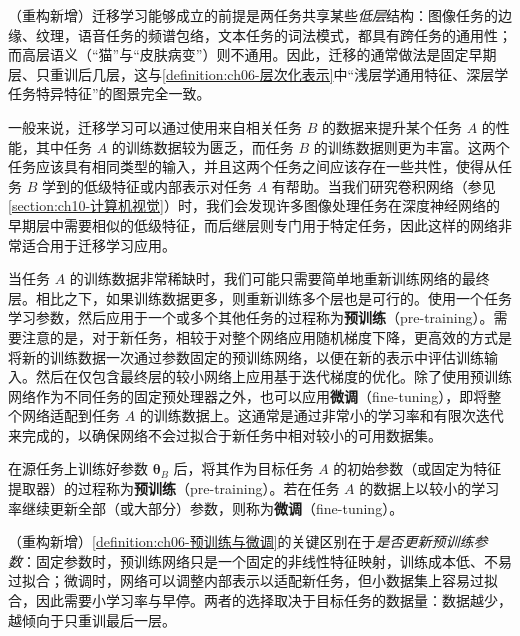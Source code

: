 \documentclass[../../main.tex]{subfiles}
\begin{document}
\begin{remark}（重构新增）迁移学习能够成立的前提是两任务共享某些\emph{低层}结构：图像任务的边缘、纹理，语音任务的频谱包络，文本任务的词法模式，都具有跨任务的通用性；而高层语义（“猫”与“皮肤病变”）则不通用。因此，迁移的通常做法是固定早期层、只重训后几层，这与\cref{definition:ch06-层次化表示}中“浅层学通用特征、深层学任务特异特征”的图景完全一致。
\end{remark}

一般来说，迁移学习可以通过使用来自相关任务 $B$ 的数据来提升某个任务 $A$ 的性能，其中任务 $A$ 的训练数据较为匮乏，而任务 $B$ 的训练数据则更为丰富。这两个任务应该具有相同类型的输入，并且这两个任务之间应该存在一些共性，使得从任务 $B$ 学到的低级特征或内部表示对任务 $A$ 有帮助。当我们研究卷积网络（参见\cref{section:ch10-计算机视觉}）时，我们会发现许多图像处理任务在深度神经网络的早期层中需要相似的低级特征，而后继层则专门用于特定任务，因此这样的网络非常适合用于迁移学习应用。

当任务 $A$ 的训练数据非常稀缺时，我们可能只需要简单地重新训练网络的最终层。相比之下，如果训练数据更多，则重新训练多个层也是可行的。使用一个任务学习参数，然后应用于一个或多个其他任务的过程称为\textbf{预训练}（pre-training）。需要注意的是，对于新任务，相较于对整个网络应用随机梯度下降，更高效的方式是将新的训练数据一次通过参数固定的预训练网络，以便在新的表示中评估训练输入。然后在仅包含最终层的较小网络上应用基于迭代梯度的优化。除了使用预训练网络作为不同任务的固定预处理器之外，也可以应用\textbf{微调}（fine-tuning），即将整个网络适配到任务 $A$ 的训练数据上。这通常是通过非常小的学习率和有限次迭代来完成的，以确保网络不会过拟合于新任务中相对较小的可用数据集。

\begin{definition}[预训练与微调]\label{definition:ch06-预训练与微调}
在源任务上训练好参数 $\boldsymbol{\theta}_B$ 后，将其作为目标任务 $A$ 的初始参数（或固定为特征提取器）的过程称为\textbf{预训练}（pre-training）。若在任务 $A$ 的数据上以较小的学习率继续更新全部（或大部分）参数，则称为\textbf{微调}（fine-tuning）。
\end{definition}

\begin{remark}（重构新增）\cref{definition:ch06-预训练与微调}的关键区别在于\emph{是否更新预训练参数}：固定参数时，预训练网络只是一个固定的非线性特征映射，训练成本低、不易过拟合；微调时，网络可以调整内部表示以适配新任务，但小数据集上容易过拟合，因此需要小学习率与早停。两者的选择取决于目标任务的数据量：数据越少，越倾向于只重训最后一层。
\end{remark}
\end{document}
